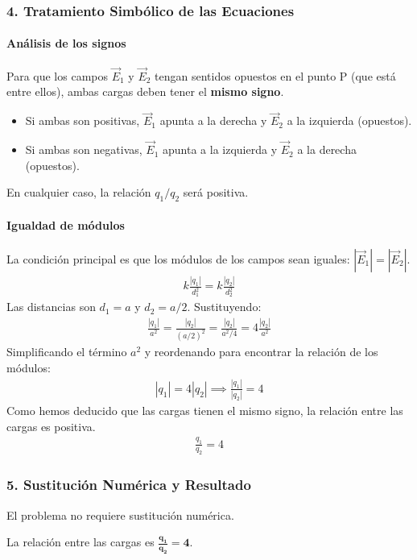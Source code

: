\subsubsection*{4. Tratamiento Simbólico de las Ecuaciones}
\paragraph{Análisis de los signos}
Para que los campos $\vec{E}_1$ y $\vec{E}_2$ tengan sentidos opuestos en el punto P (que está entre ellos), ambas cargas deben tener el \textbf{mismo signo}.
\begin{itemize}
    \item Si ambas son positivas, $\vec{E}_1$ apunta a la derecha y $\vec{E}_2$ a la izquierda (opuestos).
    \item Si ambas son negativas, $\vec{E}_1$ apunta a la izquierda y $\vec{E}_2$ a la derecha (opuestos).
\end{itemize}
En cualquier caso, la relación $q_1/q_2$ será positiva.

\paragraph{Igualdad de módulos}
La condición principal es que los módulos de los campos sean iguales: $|\vec{E}_1| = |\vec{E}_2|$.
\begin{gather}
    k \frac{|q_1|}{d_1^2} = k \frac{|q_2|}{d_2^2}
\end{gather}
Las distancias son $d_1 = a$ y $d_2 = a/2$. Sustituyendo:
\begin{gather}
    \frac{|q_1|}{a^2} = \frac{|q_2|}{(a/2)^2} = \frac{|q_2|}{a^2/4} = 4 \frac{|q_2|}{a^2}
\end{gather}
Simplificando el término $a^2$ y reordenando para encontrar la relación de los módulos:
\begin{gather}
    |q_1| = 4|q_2| \implies \frac{|q_1|}{|q_2|} = 4
\end{gather}
Como hemos deducido que las cargas tienen el mismo signo, la relación entre las cargas es positiva.
\begin{gather}
    \frac{q_1}{q_2} = 4
\end{gather}

\subsubsection*{5. Sustitución Numérica y Resultado}
El problema no requiere sustitución numérica.
\begin{cajaresultado}
    La relación entre las cargas es $\boldsymbol{\frac{q_1}{q_2} = 4}$.
\end{cajaresultado}

